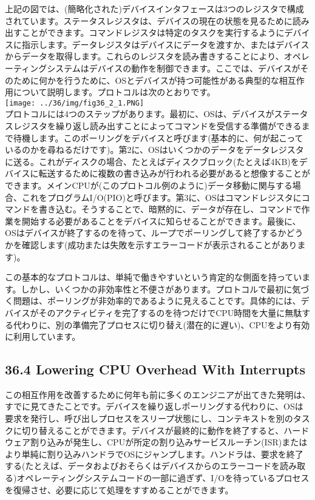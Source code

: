 上記の図では、(簡略化された)デバイスインタフェースは3つのレジスタで構成されています。ステータスレジスタは、デバイスの現在の状態を見るために読み出すことができます。コマンドレジスタは特定のタスクを実行するようにデバイスに指示します。データレジスタはデバイスにデータを渡すか、またはデバイスからデータを取得します。これらのレジスタを読み書きすることにより、オペレーティングシステムはデバイスの動作を制御できます。ここでは、デバイスがそのために何かを行うために、OSとデバイスが持つ可能性がある典型的な相互作用について説明します。プロトコルは次のとおりです。\\
\texttt{[image: ../36/img/fig36\_2\_1.PNG]}\\
プロトコルには4つのステップがあります。最初に、OSは、デバイスがステータスレジスタを繰り返し読み出すことによってコマンドを受信する準備ができるまで待機します。このポーリングをデバイスと呼びます(基本的に、何が起こっているのかを尋ねるだけです)。第2に、OSはいくつかのデータをデータレジスタに送る。これがディスクの場合、たとえばディスクブロック(たとえば4KB)をデバイスに転送するために複数の書き込みが行われる必要があると想像することができます。メインCPUが(このプロトコル例のように)データ移動に関与する場合、これをプログラムI/O(PIO)と呼びます。第3に、OSはコマンドレジスタにコマンドを書き込む。そうすることで、暗黙的に、データが存在し、コマンドで作業を開始する必要があることをデバイスに知らせることができます。最後に、OSはデバイスが終了するのを待って、ループでポーリングして終了するかどうかを確認します(成功または失敗を示すエラーコードが表示されることがあります)。

この基本的なプロトコルは、単純で働きやすいという肯定的な側面を持っています。しかし、いくつかの非効率性と不便さがあります。プロトコルで最初に気づく問題は、ポーリングが非効率的であるように見えることです。具体的には、デバイスがそのアクティビティを完了するのを待つだけでCPU時間を大量に無駄する代わりに、別の準備完了プロセスに切り替え(潜在的に遅い)、CPUをより有効に利用しています。

\hypertarget{lowering-cpu-overhead-with-interrupts}{%
\subsection*{36.4 Lowering CPU Overhead With
Interrupts}\label{lowering-cpu-overhead-with-interrupts}}

この相互作用を改善するために何年も前に多くのエンジニアが出てきた発明は、すでに見てきたことです。デバイスを繰り返しポーリングする代わりに、OSは要求を発行し、呼び出しプロセスをスリープ状態にし、コンテキストを別のタスクに切り替えることができます。デバイスが最終的に動作を終了すると、ハードウェア割り込みが発生し、CPUが所定の割り込みサービスルーチン(ISR)またはより単純に割り込みハンドラでOSにジャンプします。ハンドラは、要求を終了する(たとえば、データおよびおそらくはデバイスからのエラーコードを読み取る)オペレーティングシステムコードの一部に過ぎず、I/Oを待っているプロセスを復帰させ、必要に応じて処理をすすめることができます。

